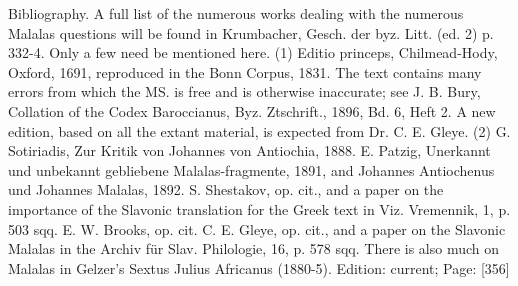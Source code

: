 Bibliography. A full list of the numerous works dealing with the numerous Malalas questions will be found in Krumbacher, Gesch. der byz. Litt. (ed. 2) p. 332-4. Only a few need be mentioned here. (1) Editio princeps, Chilmead-Hody, Oxford, 1691, reproduced in the Bonn Corpus, 1831. The text contains many errors from which the MS. is free and is otherwise inaccurate; see J. B. Bury, Collation of the Codex Baroccianus, Byz. Ztschrift., 1896, Bd. 6, Heft 2. A new edition, based on all the extant material, is expected from Dr. C. E. Gleye. (2) G. Sotiriadis, Zur Kritik von Johannes von Antiochia, 1888. E. Patzig, Unerkannt und unbekannt gebliebene Malalas-fragmente, 1891, and Johannes Antiochenus und Johannes Malalas, 1892. S. Shestakov, op. cit., and a paper on the importance of the Slavonic translation for the Greek text in Viz. Vremennik, 1, p. 503 sqq. E. W. Brooks, op. cit. C. E. Gleye, op. cit., and a paper on the Slavonic Malalas in the Archiv für Slav. Philologie, 16, p. 578 sqq. There is also much on Malalas in Gelzer\texthebrew{}’s Sextus Julius Africanus (1880-5).
Edition: current; Page: [356]

